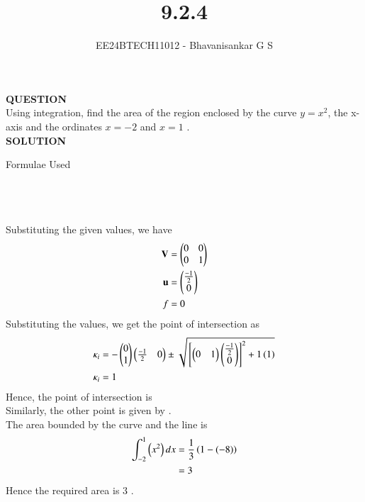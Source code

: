 \documentclass[journal]{IEEEtran}
\begin{document}

\vspace{3cm}

\title{9.2.4}
\author{EE24BTECH11012 - Bhavanisankar G S}
{\let\newpage\relax\maketitle}

\renewcommand{\thefigure}{\theenumi}
\renewcommand{\thetable}{\theenumi}
\setlength{\intextsep}{10pt} %


\renewcommand{\thetable}{\theenumi}

\textbf{QUESTION} \\
Using integration, find the area of the region enclosed by the curve $ y = x^2 $, the x-axis and the ordinates $ x = -2 $ and $ x = 1 $ . \\
\textbf{SOLUTION} \\

\begin{table}[h!]
	\centering
        
	\caption{Formulae Used}
	\label{tab9.3.16}
\end{table} \\ \\ \\
Substituting the given values, we have \\
\begin{align}
	\mathbf{V} &= \begin{pmatrix} 0 & 0 \\ 0 & 1 \end{pmatrix} \\
	\mathbf{u} &= \begin{pmatrix} \frac{-1}{2} \\ 0 \end{pmatrix} \\
	f &= 0 \\
\end{align}
Substituting the values, we get the point of intersection as \\
\begin{align}
	\kappa_i &= -\begin{pmatrix}0 \\ 1\end{pmatrix}\begin{pmatrix}\frac{-1}{2} & 0\end{pmatrix} \pm \sqrt{{}\left[\begin{pmatrix}0 & 1\end{pmatrix}\begin{pmatrix} \frac{-1}{2} \\ 0\end{pmatrix} \right]^2 + 1\left(1\right)} \\
	\kappa_i &= 1 \\
\end{align}
Hence, the point of intersection is  \\
Similarly, the other point is given by  .\\
The area bounded by the curve and the line is \\
\begin{align}
	\int_{-2}^{1} \left(x^2\right) dx &= \frac{1}{3}\left( 1 - (-8) \right) \\
	&= 3 \\
\end{align}
Hence the required area is $3$ .
	
\end{document}
